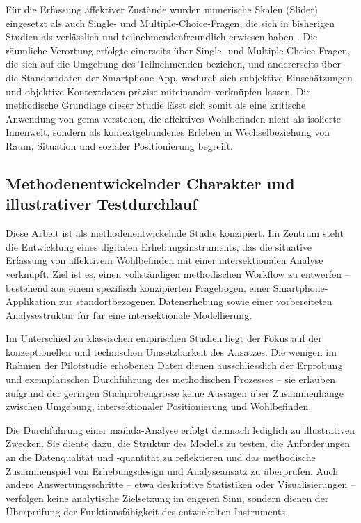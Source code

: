 Für die Erfassung affektiver Zustände wurden numerische Skalen (Slider) eingesetzt als auch Single- und Multiple-Choice-Fragen, die sich in bisherigen Studien als verlässlich und teilnehmendenfreundlich erwiesen haben \parencite{cookeMeasuringWellBeingReview2016}. Die räumliche Verortung erfolgte einerseits über Single- und Multiple-Choice-Fragen, die sich auf die Umgebung des Teilnehmenden beziehen, und andererseits über die Standortdaten der Smartphone-App, wodurch sich subjektive Einschätzungen und objektive Kontextdaten präzise miteinander verknüpfen lassen. Die methodische Grundlage dieser Studie lässt sich somit als eine kritische Anwendung von \acrshort{gema} verstehen, die affektives Wohlbefinden nicht als isolierte Innenwelt, sondern als kontextgebundenes Erleben in Wechselbeziehung von Raum, Situation und sozialer Positionierung begreift.

\subsection{Methodenentwickelnder Charakter und illustrativer Testdurchlauf} \label{sec:methodenentwickelnd}

Diese Arbeit ist als methodenentwickelnde Studie konzipiert. Im Zentrum steht die Entwicklung eines digitalen Erhebungsinstruments, das die situative Erfassung von affektivem Wohlbefinden mit einer intersektionalen Analyse verknüpft. Ziel ist es, einen vollständigen methodischen Workflow zu entwerfen – bestehend aus einem spezifisch konzipierten Fragebogen, einer Smartphone-Applikation zur standortbezogenen Datenerhebung sowie einer vorbereiteten Analysestruktur für für eine intersektionale Modellierung.

Im Unterschied zu klassischen empirischen Studien liegt der Fokus auf der konzeptionellen und technischen Umsetzbarkeit des Ansatzes. Die wenigen im Rahmen der Pilotstudie erhobenen Daten dienen ausschliesslich der Erprobung und exemplarischen Durchführung des methodischen Prozesses – sie erlauben aufgrund der geringen Stichprobengrösse keine  Aussagen über Zusammenhänge zwischen Umgebung, intersektionaler Positionierung und Wohlbefinden.

Die Durchführung einer \acrshort{maihda}-Analyse erfolgt demnach lediglich zu illustrativen Zwecken. Sie diente dazu, die Struktur des Modells zu testen, die Anforderungen an die Datenqualität und -quantität zu reflektieren und das methodische Zusammenspiel von Erhebungsdesign und Analyseansatz zu überprüfen. Auch andere Auswertungsschritte – etwa deskriptive Statistiken oder Visualisierungen – verfolgen keine analytische Zielsetzung im engeren Sinn, sondern dienen der Überprüfung der Funktionsfähigkeit des entwickelten Instruments.

